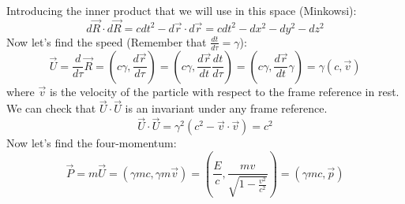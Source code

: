 \documentclass{article}
\begin{document}
Introducing the inner product that we will use in this space (Minkowsi):
\begin{equation}
  d\vec{R} \cdot d\vec{R} = cdt^2 - d\vec{r}\cdot d\vec{r} = cdt^2 - dx^2 - dy^2 - dz^2 
\end{equation}
Now let's find the speed (Remember that $\frac{dt}{d\tau} = \gamma$):
\begin{equation}
  \vec{U} = \frac{d}{d\tau} \vec{R} = (c \gamma,\frac{d\vec{r}}{d\tau}) = (c \gamma,\frac{d\vec{r}}{dt} \frac{dt}{d \tau}) = (c \gamma,\frac{d\vec{r}}{dt} \gamma)= \gamma (c,\vec{v})
\end{equation}
where $\vec{v}$ is the velocity of the particle with respect to the frame reference in rest. We can check that $\vec{U} \cdot \vec{U}$ is an invariant under any frame reference.
\begin{equation}
  \vec{U} \cdot \vec{U} = \gamma^2(c^2 - \vec{v} \cdot \vec{v}) = c^2
\end{equation}
Now let's find the four-momentum:
\begin{equation}
  \vec{P} = m\vec{U} = (\gamma mc,\gamma m\vec{v}) = (\frac{E}{c},\frac{mv}{\sqrt{1 - \frac{v^2}{c^2}}}) = (\gamma mc, \vec{p})
\end{equation}
\end{document}
